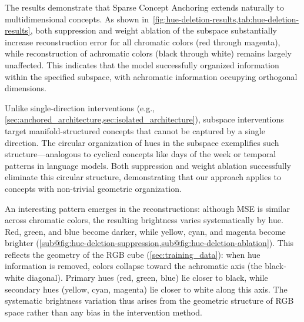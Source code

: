 The results demonstrate that Sparse Concept Anchoring extends naturally to multidimensional concepts. As shown in~\cref{fig:hue-deletion-results,tab:hue-deletion-results}, both suppression and weight ablation of the  subspace substantially increase reconstruction error for all chromatic colors (red through magenta), while reconstruction of achromatic colors (black through white) remains largely unaffected. This indicates that the model successfully organized  information within the specified subspace, with achromatic information occupying orthogonal dimensions.

Unlike single-direction interventions (e.g., \cref{sec:anchored_architecture,sec:isolated_architecture}), subspace interventions target manifold-structured concepts that cannot be captured by a single direction. The circular organization of hues in the  subspace exemplifies such structure---analogous to cyclical concepts like days of the week or temporal patterns in language models. Both suppression and weight ablation successfully eliminate this circular structure, demonstrating that our approach applies to concepts with non-trivial geometric organization.

An interesting pattern emerges in the reconstructions: although MSE is similar across chromatic colors, the resulting brightness varies systematically by hue. Red, green, and blue become darker, while yellow, cyan, and magenta become brighter (\cref{sub@fig:hue-deletion-suppression,sub@fig:hue-deletion-ablation}). This reflects the geometry of the RGB cube (\cref{sec:training_data}): when hue information is removed, colors collapse toward the achromatic axis (the black-white diagonal). Primary hues (red, green, blue) lie closer to black, while secondary hues (yellow, cyan, magenta) lie closer to white along this axis. The systematic brightness variation thus arises from the geometric structure of RGB space rather than any bias in the intervention method.
